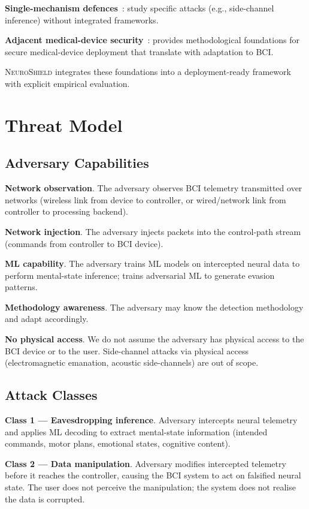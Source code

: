 \documentclass[sigconf,nonacm]{acmart}
\begin{document}
\textbf{Single-mechanism defences}~\cite{martinovic2024bcispoof}:
study specific attacks (e.g., side-channel inference) without
integrated frameworks.

\textbf{Adjacent medical-device security}~\cite{rushanan2024medsec}:
provides methodological foundations for secure medical-device
deployment that translate with adaptation to BCI.

\textsc{NeuroShield} integrates these foundations into a
deployment-ready framework with explicit empirical evaluation.

\section{Threat Model}

\subsection{Adversary Capabilities}

\textbf{Network observation}. The adversary observes BCI
telemetry transmitted over networks (wireless link from device to
controller, or wired/network link from controller to processing
backend).

\textbf{Network injection}. The adversary injects packets into the
control-path stream (commands from controller to BCI device).

\textbf{ML capability}. The adversary trains ML models on
intercepted neural data to perform mental-state inference; trains
adversarial ML to generate evasion patterns.

\textbf{Methodology awareness}. The adversary may know the
detection methodology and adapt accordingly.

\textbf{No physical access}. We do not assume the adversary has
physical access to the BCI device or to the user. Side-channel
attacks via physical access (electromagnetic emanation,
acoustic side-channels) are out of scope.

\subsection{Attack Classes}

\textbf{Class 1 --- Eavesdropping inference}. Adversary intercepts
neural telemetry and applies ML decoding to extract
mental-state information (intended commands, motor plans,
emotional states, cognitive content).

\textbf{Class 2 --- Data manipulation}. Adversary modifies
intercepted telemetry before it reaches the controller, causing
the BCI system to act on falsified neural state. The user does
not perceive the manipulation; the system does not realise the
data is corrupted.
\end{document}
